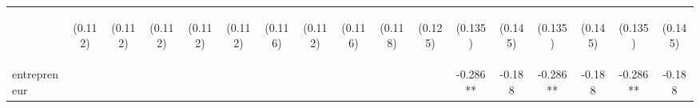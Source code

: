 \begin{center}
\begin{tabular}{lcccccccccccccccc}
\vspace{4pt} & \begin{footnotesize}(0.112)\end{footnotesize} & \begin{footnotesize}(0.112)\end{footnotesize} & \begin{footnotesize}(0.112)\end{footnotesize} & \begin{footnotesize}(0.112)\end{footnotesize} & \begin{footnotesize}(0.112)\end{footnotesize} & \begin{footnotesize}(0.116)\end{footnotesize} & \begin{footnotesize}(0.112)\end{footnotesize} & \begin{footnotesize}(0.116)\end{footnotesize} & \begin{footnotesize}(0.118)\end{footnotesize} & \begin{footnotesize}(0.125)\end{footnotesize} & \begin{footnotesize}(0.135)\end{footnotesize} & \begin{footnotesize}(0.145)\end{footnotesize} & \begin{footnotesize}(0.135)\end{footnotesize} & \begin{footnotesize}(0.145)\end{footnotesize} & \begin{footnotesize}(0.135)\end{footnotesize} & \begin{footnotesize}(0.145)\end{footnotesize} \\
entrepreneur &  &  &  &  &  &  &  &  &  &  & -0.286** & -0.188 & -0.286** & -0.188 & -0.286** & -0.188 \\

\end{tabular}
\end{center}
